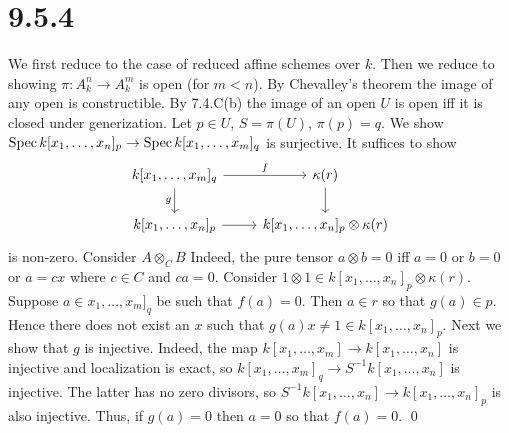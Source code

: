 \documentclass{article}
\begin{document}
\section{9.5.4}
We first reduce to the case of reduced affine schemes over
$k$. Then we reduce to showing $\pi: A^n_k \to A^m_k$ is
open (for $m < n$). By Chevalley's theorem the image of any open
is constructible. By 7.4.C(b) the image of an open $U$ is
open iff it is closed under generization. Let $p \in U$,
$S=\pi(U)$, $\pi(p)=q$. We show $\operatorname{Spec} k[x_1, \dots, x_n]_p \to \operatorname{Spec}
    k[x_1, \dots, x_m]_q$
is surjective. It suffices to show \[\begin{tikzcd}
        {k[x_1, \dots, x_m]_q}                        & {\kappa(r)}
        \\{k[x_1, \dots,x_n]_p} &
        {k[x_1, \dots,x_n]_p \otimes \kappa(r)}
        \arrow["f", from=1-1, to=1-2]
        \arrow["g"', from=1-1, to=2-1]
        \arrow[from=1-2, to=2-2]
        \arrow[from=2-1, to=2-2]
    \end{tikzcd}\] is non-zero.
Consider $A \otimes_C B$ Indeed, the pure tensor $a \otimes b = 0$
iff $a=0$ or $b=0$ or $a=cx$
where $c \in C$ and $ca=0$. Consider
$1 \otimes 1 \in k[x_1, \dots,x_n]_p \otimes \kappa(r)$. Suppose $a \in x_1, \dots, x_m]_q$ be such that
$f(a)=0$. Then $a \in r$ so that
$g(a) \in p$. Hence there does not exist an $x$
such that $g(a)x \neq 1 \in k[x_1, \dots,x_n]_p$. Next we show that $g$ is
injective. Indeed, the map $k[x_1, \dots, x_m] \to k[x_1, \dots, x_n]$ is injective and localization
is exact, so $k[x_1, \dots, x_m]_q \to S^{-1}k[x_1,
    \dots, x_n]$ is injective. The latter has no zero
divisors, so $S^{-1}k[x_1, \dots, x_n] \to
    k[x_1, \dots, x_n]_p$ is also injective. Thus, if
$g(a)=0$ then $a=0$ so that
$f(a)=0$. \qed
\end{document}
